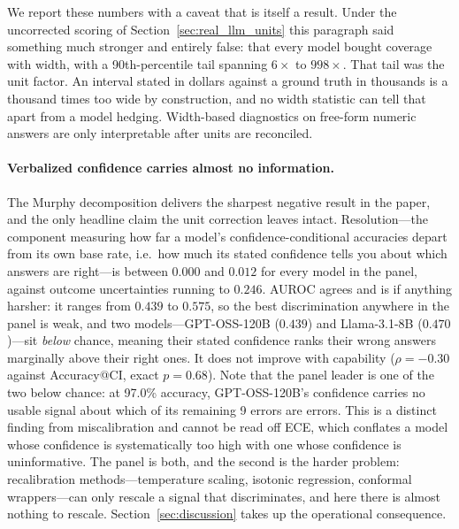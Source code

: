\documentclass{article}
\begin{document}
We report these numbers with a caveat that is itself a result. Under the uncorrected scoring of Section~\ref{sec:real_llm_units} this paragraph said something much stronger and entirely false: that every model bought coverage with width, with a 90th-percentile tail spanning $6\times$ to $998\times$. That tail was the unit factor. An interval stated in dollars against a ground truth in thousands is a thousand times too wide by construction, and no width statistic can tell that apart from a model hedging. Width-based diagnostics on free-form numeric answers are only interpretable after units are reconciled.

\paragraph{Verbalized confidence carries almost no information.} The Murphy decomposition delivers the sharpest negative result in the paper, and the only headline claim the unit correction leaves intact. Resolution---the component measuring how far a model's confidence-conditional accuracies depart from its own base rate, i.e.\ how much its stated confidence tells you about which answers are right---is between $0.000$ and $0.012$ for every model in the panel, against outcome uncertainties running to $0.246$. AUROC agrees and is if anything harsher: it ranges from $0.439$ to $0.575$, so the best discrimination anywhere in the panel is weak, and two models---GPT-OSS-120B ($0.439$) and Llama-3.1-8B ($0.470$)---sit \emph{below} chance, meaning their stated confidence ranks their wrong answers marginally above their right ones. It does not improve with capability ($\rho = -0.30$ against Accuracy@CI, exact $p = 0.68$). Note that the panel leader is one of the two below chance: at 97.0\% accuracy, GPT-OSS-120B's confidence carries no usable signal about which of its remaining 9 errors are errors. This is a distinct finding from miscalibration and cannot be read off ECE, which conflates a model whose confidence is systematically too high with one whose confidence is uninformative. The panel is both, and the second is the harder problem: recalibration methods---temperature scaling, isotonic regression, conformal wrappers---can only rescale a signal that discriminates, and here there is almost nothing to rescale. Section~\ref{sec:discussion} takes up the operational consequence.
\end{document}
